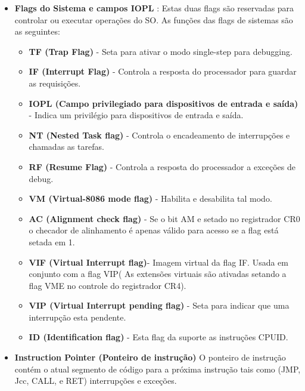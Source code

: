 \documentclass[12pt,a4paper,brazilian,utf8]{ppgsi}
\begin{document}
\begin{itemize}
        \item \textbf{Flags do Sistema e campos IOPL} : Estas duas flags são reservadas para controlar ou executar operações do SO. As funções das flags de sistemas são as seguintes:
        
        
        \begin{itemize}
            \item \textbf{TF (Trap Flag)} - Seta para ativar o modo single-step para debugging.

            \item \textbf{IF (Interrupt Flag)} - Controla a resposta do processador para guardar as requisições.
            
            \item \textbf{IOPL (Campo privilegiado para dispositivos de entrada e saída)} - Indica um privilégio para dispositivos de entrada e saída.
            
            \item \textbf{NT (Nested Task flag)} - Controla o encadeamento de interrupções e chamadas as tarefas.
            
            \item \textbf{RF (Resume Flag)} - Controla a resposta do processador a exceções de debug.
            
            \item \textbf{VM (Virtual-8086 mode flag)} - Habilita e desabilita tal modo. 
            
            \item \textbf{AC (Alignment check flag)} - Se o bit AM e setado no registrador CR0 o checador de alinhamento é apenas válido para acesso se a flag está setada em 1.
            
            \item \textbf{VIF (Virtual Interrupt flag)}- Imagem virtual da flag IF. Usada em conjunto com a flag VIP( As extensões virtuais são ativadas setando a flag VME no controle do registrador CR4).
            
            \item \textbf{VIP (Virtual Interrupt pending flag)} - Seta para indicar que uma interrupção esta pendente.
    
            \item \textbf{ID (Identification flag)} - Esta flag da suporte as instruções CPUID.

        \end{itemize}
        
        \item \textbf{Instruction Pointer (Ponteiro de instrução)}
        O ponteiro de instrução contém o atual segmento de código para a próxima instrução tais como (JMP, Jcc, CALL, e RET) interrupções e exceções. 

    \end{itemize}
    
\end{document}
